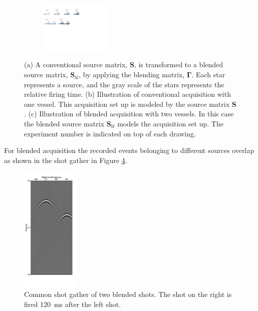\begin{figure}
\begin{subfigure}[t]{\textwidth}
	\caption{}
	\label{fig:Ch-Theory-BlendedSource-Conventional}
	\end{subfigure}
	\par\bigskip
	\begin{subfigure}[t]{\textwidth}
	\centering
	\includegraphics[width=0.36\textwidth]{Plots/Blended-Source-New}
	\caption{}
	\label{fig:Ch-Theory-BlendedSource-Blended}
	\end{subfigure}
	
	\caption{(a) A conventional source matrix, $\mathbf{S}$, is transformed to a blended source matrix, $\mathbf{S}_{bl}$, by applying the blending matrix, $\mathbf{\Gamma}$. Each star represents a source, and the gray scale of the stars represents the relative firing time. (b) Illustration of conventional acquisition with one vessel. This acquisition set up is modeled by the source matrix $\mathbf{S}$. (c) Illustration of blended acquisition with two vessels. In this case the blended source matrix $\mathbf{S}_{bl}$ models the acquisition set up. The experiment number is indicated on top of each drawing.}
	\label{fig:Ch-Theory-BlendedSource}
	
\end{figure}


For blended acquisition the recorded events belonging to different sources overlap as shown in the shot gather in Figure \ref{fig:Ch-Theory-BlendedData}. 

\begin{figure}
	\centering
	\includegraphics[width=0.25\textwidth]{Plots/Mahdad/30iter/BlendedCSG_sh1-edit_copy}
	\caption{Common shot gather of two blended shots. The shot on the right is fired \SI{120}{\milli\second} after the left shot.}
	\label{fig:Ch-Theory-BlendedData}
\end{figure}

